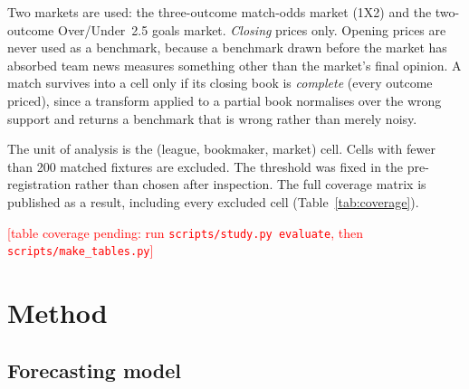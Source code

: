 \documentclass[11pt,a4paper]{article}
\newcommand{\inputtable}[1]{%
  {\small\setlength{\tabcolsep}{4.5pt}}%
}
\newcommand{\pendingtable}[1]{%
  \begin{center}\textcolor{red}{[table #1 pending: run \texttt{scripts/study.py evaluate},
  then \texttt{scripts/make\_tables.py}]}\end{center}}
\begin{document}
Two markets are used: the three-outcome match-odds market (1X2) and the
two-outcome Over/Under~2.5 goals market. \emph{Closing} prices only. Opening
prices are never used as a benchmark, because a benchmark drawn before the
market has absorbed team news measures something other than the market's final
opinion. A match survives into a cell only if its closing book is
\emph{complete} (every outcome priced), since a transform applied to a partial
book normalises over the wrong support and returns a benchmark that is wrong
rather than merely noisy.

The unit of analysis is the (league, bookmaker, market) cell. Cells with fewer
than 200 matched fixtures are excluded. The threshold was fixed in the
pre-registration rather than chosen after inspection. The full coverage matrix
is published as a result, including every excluded cell
(Table~\ref{tab:coverage}).

\begin{table}[ht]
  \centering
  \caption{Coverage. Complete closing books per bookmaker and market, and the
  cells that clear the 200-fixture threshold.}
  \label{tab:coverage}
    {\inputtable{generated/tab-coverage.tex}}
    {\pendingtable{coverage}}
\end{table}

\section{Method}
\label{sec:method}

\subsection{Forecasting model}
\label{sec:model}
\end{document}
